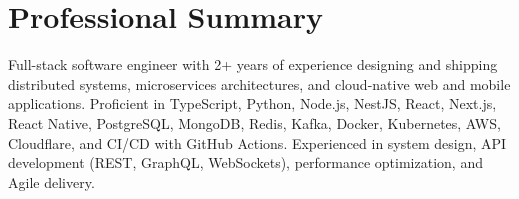 \section{Professional Summary}
\small{
Full-stack software engineer with 2+ years of experience designing and shipping distributed systems, microservices architectures, and cloud-native web and mobile applications. Proficient in TypeScript, Python, Node.js, NestJS, React, Next.js, React Native, PostgreSQL, MongoDB, Redis, Kafka, Docker, Kubernetes, AWS, Cloudflare, and CI/CD with GitHub Actions. Experienced in system design, API development (REST, GraphQL, WebSockets), performance optimization, and Agile delivery.
}
